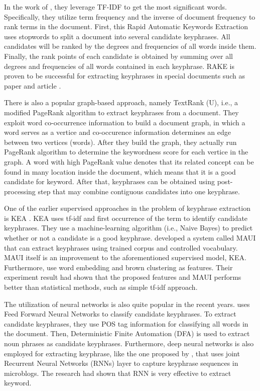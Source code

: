 In the work of \cite{sparck1972statistical}, they leverage TF-IDF to get the most significant words. Specifically, they utilize term frequency and the inverse of document frequency to rank terms in the document. First, this Rapid Automatic Keywords Extraction \cite{rake} uses stopwords to split a document into several candidate keyphrases. All candidates will be ranked by the degrees and frequencies of all words inside them. Finally, the rank points of each candidate is obtained by summing over all degrees and frequencies of all words contained in each keyphrase. RAKE is proven to be successful for extracting keyphrases in special documents such as paper and article \cite{rake}.

There is also a popular graph-based approach, namely TextRank (U), i.e., a modified PageRank algorithm to extract keyphrases from a document. They exploit word co-occurrence information to build a document graph, in which a word serves as a vertice and co-occurence information determines an edge between two vertices (words). After they build the graph, they actually run PageRank algorithm to determine the keywordness score for each vertice in the graph. A word with high PageRank value denotes that its related concept can be found in many location inside the document, which means that it is a good candidate for keyword. After that, keyphrases can be obtained using post-processing step that may combine contiguous candidates into one keyphrase.

One of the earlier supervised approaches in the problem of keyphrase extraction is KEA \cite{witten1999kea}. KEA uses tf-idf and first occurrence of the term to identify candidate keyphrases. They use a machine-learning algorithm (i.e., Naive Bayes) to predict whether or not a candidate is a good keyphrase. \cite{medelyan2009human} developed a system called MAUI that can extract keyphrases using trained corpus and controlled vocabulary. MAUI itself is an improvement to the aforementioned supervised model, KEA. Furthermore, \cite{marujoMAUI} use word embedding and brown clustering as features. Their experiment result had shown that the proposed features and MAUI performs better than statistical methods, such as simple tf-idf approach.

The utilization of neural networks is also quite popular in the recent years. \cite{ekpNeuralNetworks} uses Feed Forward Neural Networks to classify candidate keyphrases. To extract candidate keyphrases, they use POS tag information for classifying all words in the document. Then, Deterministic Finite Automation (DFA) is used to extract noun phrases as candidate keyphrases. Furthermore, deep neural networks is also employed for extracting keyphrase, like the one proposed by \cite{zhang2016keyphrase}, that uses joint Recurrent Neural Networks (RNNs) layer to capture keyphrase sequences in microblogs. The research had shown that RNN is very effective to extract keyword.

